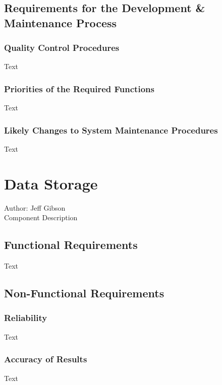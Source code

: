 \documentclass[12pt]{article}
\begin{document}
\subsection{Requirements for the Development \& Maintenance Process}

\subsubsection {Quality Control Procedures}

Text

\subsubsection {Priorities of the Required Functions}

Text

\subsubsection {Likely Changes to System Maintenance Procedures}

Text

\section{Data Storage}
Author: Jeff Gibson\\

\noindent Component Description

\subsection{Functional Requirements}

Text

\subsection{Non-Functional Requirements}

\subsubsection {Reliability}

Text

\subsubsection {Accuracy of Results}
 
Text
\end{document}
